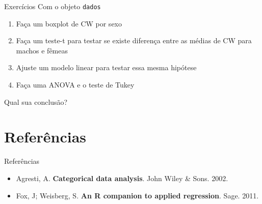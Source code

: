 \documentclass[10pt]{beamer}\usepackage[]{graphicx}\usepackage[]{color}
\theoremstyle{definition}
\begin{document}
\begin{frame}[fragile]{Exercícios}
Com o objeto \texttt{dados}
\begin{enumerate}[(1)]
\item Faça um boxplot de CW por sexo
\item Faça um teste-t para testar se existe diferença entre as médias de
  CW para machos e fêmeas
\item Ajuste um modelo linear para testar essa mesma hipótese
\item Faça uma ANOVA e o teste de Tukey
\end{enumerate}
Qual sua conclusão?
\end{frame}

\section{Referências}


\begin{frame}{Referências}
  \begin{itemize}
  \item Agresti, A. \textbf{Categorical data analysis}. John Wiley \&
    Sons. 2002.
  \item Fox, J; Weisberg, S. \textbf{An R companion to applied
      regression}. Sage. 2011.
  \end{itemize}
\end{frame}
\end{document}
